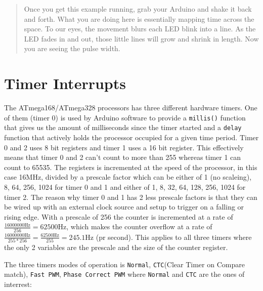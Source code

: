 \documentclass[a4paper, oneside, final]{memoir}
\begin{document}
\begin{quotation}

  Once you get this example running, grab your Arduino and shake it
  back and forth. What you are doing here is essentially mapping time
  across the space. To our eyes, the movement blurs each LED blink
  into a line. As the LED fades in and out, those little lines will
  grow and shrink in length. Now you are seeing the pulse width.
\end{quotation}



\section{Timer Interrupts}


The ATmega168/ATmega328 processors has three different hardware
timers. One of them (timer 0) is used by Arduino software to provide a
\texttt{millis()} function that gives us the amount of milliseconds
since the timer started and a \texttt{delay} function that actively
holds the processor occupied for a given time period. Timer 0 and 2
uses 8 bit registers and timer 1 uses a 16 bit register. This
effectively means that timer 0 and 2 can't count to more than 255
whereas timer 1 can count to 65535. The registers is incremented at
the speed of the processor, in this case 16MHz, divided by a prescale
factor which can be either of 1 (no scaleing), 8, 64, 256, 1024 for
timer 0 and 1 and either of 1, 8, 32, 64, 128, 256, 1024 for timer
2. The reason why timer 0 and 1 has 2 less prescale factors is that
they can be wired up with an external clock source and setup to
trigger on a falling or rising edge. With a prescale of 256 the
counter is incremented at a rate of $\frac{16000000\mathrm{Hz}}{256} =
62500\mathrm{Hz}$, which makes the counter overflow at a rate of
$\frac{16000000\mathrm{Hz}}{255*256} = \frac{62500\mathrm{Hz}}{255} =
245.1\mathrm{Hz}$ (pr second). This applies to all three timers where the only
2 variables are the prescale and the size of the counter register.

The three timers modes of operation is \texttt{Normal},
\texttt{CTC}(Clear Timer on Compare match), \texttt{Fast PWM},
\texttt{Phase Correct PWM} where \texttt{Normal} and \texttt{CTC} are
the ones of interrest:
\end{document}
